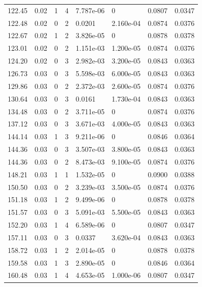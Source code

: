 \documentclass[preview]{standalone}
\begin{document}
{{{\begin{tabular}{L{1.2cm}C{1.2cm} C{0.3cm}C{0.5cm} C{1.4cm}C{1.4cm} C{1.4cm}C{1.4cm}}
  122.45  &  0.02  & 1     &  4 &  7.787e-06  & 0  & 0.0807 &  0.0347   \\ 
  122.48  &  0.02  & 0     &  2 &  0.0201  & 2.160e-04  & 0.0874 &  0.0376   \\ 
  122.67  &  0.02  & 1     &  2 &  3.826e-05  & 0  & 0.0878 &  0.0378   \\ 
  123.01  &  0.02  & 0     &  2 &  1.151e-03  & 1.200e-05  & 0.0874 &  0.0376   \\ 
  124.20  &  0.02  & 0     &  3 &  2.982e-03  & 3.200e-05  & 0.0843 &  0.0363   \\ 
  126.73  &  0.03  & 0     &  3 &  5.598e-03  & 6.000e-05  & 0.0843 &  0.0363   \\ 
  129.86  &  0.03  & 0     &  2 &  2.372e-03  & 2.600e-05  & 0.0874 &  0.0376   \\ 
  130.64  &  0.03  & 0     &  3 &  0.0161  & 1.730e-04  & 0.0843 &  0.0363   \\ 
  134.48  &  0.03  & 0     &  2 &  3.711e-05  & 0  & 0.0874 &  0.0376   \\ 
  137.12  &  0.03  & 0     &  3 &  3.671e-03  & 4.000e-05  & 0.0843 &  0.0363   \\ 
  144.14  &  0.03  & 1     &  3 &  9.211e-06  & 0  & 0.0846 &  0.0364   \\ 
  144.36  &  0.03  & 0     &  3 &  3.507e-03  & 3.800e-05  & 0.0843 &  0.0363   \\ 
  144.36  &  0.03  & 0     &  2 &  8.473e-03  & 9.100e-05  & 0.0874 &  0.0376   \\ 
  148.21  &  0.03  & 1     &  1 &  1.532e-05  & 0  & 0.0900 &  0.0388   \\ 
  150.50  &  0.03  & 0     &  2 &  3.239e-03  & 3.500e-05  & 0.0874 &  0.0376   \\ 
  151.18  &  0.03  & 1     &  2 &  9.499e-06  & 0  & 0.0878 &  0.0378   \\ 
  151.57  &  0.03  & 0     &  3 &  5.091e-03  & 5.500e-05  & 0.0843 &  0.0363   \\ 
  152.20  &  0.03  & 1     &  4 &  6.589e-06  & 0  & 0.0807 &  0.0347   \\ 
  157.11  &  0.03  & 0     &  3 &  0.0337  & 3.620e-04  & 0.0843 &  0.0363   \\ 
  158.72  &  0.03  & 1     &  2 &  2.014e-05  & 0  & 0.0878 &  0.0378   \\ 
  159.58  &  0.03  & 1     &  3 &  2.890e-05  & 0  & 0.0846 &  0.0364   \\ 
  160.48  &  0.03  & 1     &  4 &  4.653e-05  & 1.000e-06  & 0.0807 &  0.0347   \\ 

\end{tabular}}}}
\end{document}

